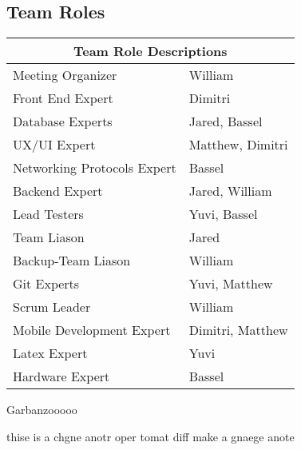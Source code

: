 \documentclass{article}
\begin{document}
\subsection{Team Roles}
\begin{tabular}{ |p{5cm}|p{8cm}| }
	\hline
	\multicolumn{2}{|c|}{Team Role Descriptions} \\
	\hline
	Meeting Organizer & William \\
	\hline
	Front End Expert & Dimitri \\
	\hline
	Database Experts  & Jared, Bassel \\
	\hline
	UX/UI Expert & Matthew, Dimitri \\
	\hline
	Networking Protocols Expert & Bassel \\
	\hline
	Backend Expert & Jared, William \\
	\hline
	Lead Testers & Yuvi, Bassel \\
	\hline
	Team Liason & Jared \\
	\hline
	Backup-Team Liason & William \\
	\hline
	Git Experts & Yuvi, Matthew\\
	\hline
	Scrum Leader & William \\
	\hline
	Mobile Development Expert & Dimitri, Matthew \\
	\hline
	Latex Expert & Yuvi \\
	\hline
	Hardware Expert & Bassel \\
	\hline
\end{tabular}

\subsdaksml

Garbanzooooo

thise is a chgne anotr oper tomat diff make a gnaege anote
\end{document}
